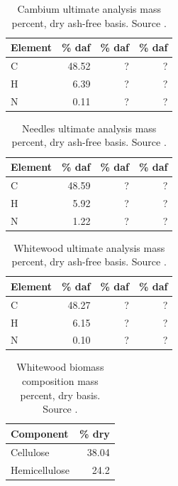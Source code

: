 \begin{table}[H]
    \centering
    \caption{Cambium ultimate analysis mass percent, dry ash-free basis. Source \cite{Unknown-2019}.}
    \begin{tabular}{lrrr}
        \toprule
        Element & \% daf & \% daf & \% daf \\
        \midrule
        C        & 48.52 & ? & ? \\
        H        & 6.39  & ? & ? \\
        N        & 0.11  & ? & ? \\
        \bottomrule
    \end{tabular}
\end{table}

\begin{table}[H]
    \centering
    \caption{Needles ultimate analysis mass percent, dry ash-free basis. Source \cite{Unknown-2019}.}
    \begin{tabular}{lrrr}
        \toprule
        Element & \% daf & \% daf & \% daf \\
        \midrule
        C        & 48.59 & ? & ? \\
        H        & 5.92  & ? & ? \\
        N        & 1.22  & ? & ? \\
        \bottomrule
    \end{tabular}
\end{table}

\begin{table}[H]
    \centering
    \caption{Whitewood ultimate analysis mass percent, dry ash-free basis. Source \cite{Unknown-2019}.}
    \begin{tabular}{lrrr}
        \toprule
        Element & \% daf & \% daf & \% daf \\
        \midrule
        C        & 48.27 & ? & ? \\
        H        & 6.15  & ? & ? \\
        N        & 0.10  & ? & ? \\
        \bottomrule
    \end{tabular}
\end{table}

\begin{table}[H]
    \centering
    \caption{Whitewood biomass composition mass percent, dry basis. Source \cite{Unknown-2020}.}
    \begin{tabular}{lr}
        \toprule
        Component & \% dry \\
        \midrule
        Cellulose       & 38.04 \\
        Hemicellulose   & 24.2  \\
        \bottomrule
    \end{tabular}
\end{table}
